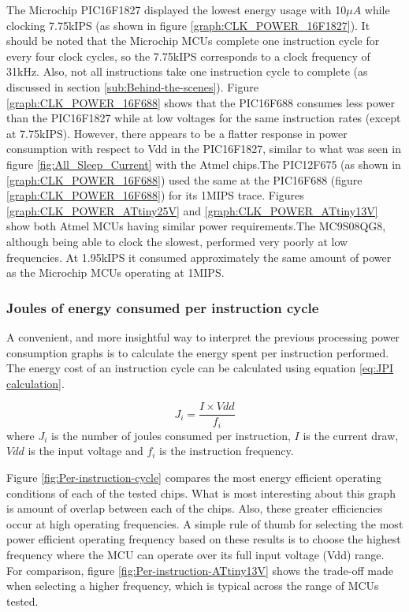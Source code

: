 The Microchip PIC16F1827 displayed the lowest energy usage with 10$\mu A$
while clocking 7.75kIPS (as shown in figure \ref{graph:CLK_POWER_16F1827}).
It should be noted that the Microchip MCUs complete one instruction
cycle for every four clock cycles, so the 7.75kIPS corresponds to
a clock frequency of 31kHz. Also, not all instructions take one instruction
cycle to complete (as discussed in section \ref{sub:Behind-the-scenes}).
Figure \ref{graph:CLK_POWER_16F688} shows that the PIC16F688 consumes
less power than the PIC16F1827 while at low voltages for the same
instruction rates (except at 7.75kIPS). However, there appears to
be a flatter response in power consumption with respect to Vdd in
the PIC16F1827, similar to what was seen in figure \ref{fig:All_Sleep_Current}
with the Atmel chips.The PIC12F675 (as shown in \ref{graph:CLK_POWER_16F688})
used the same at the PIC16F688 (figure \ref{graph:CLK_POWER_16F688})
for its 1MIPS trace. Figures \ref{graph:CLK_POWER_ATtiny25V} and
\ref{graph:CLK_POWER_ATtiny13V} show both Atmel MCUs having similar
power requirements.The MC9S08QG8, although being able to clock the
slowest, performed very poorly at low frequencies. At 1.95kIPS it
consumed approximately the same amount of power as the Microchip MCUs
operating at 1MIPS.


\subsubsection*{Joules of energy consumed per instruction cycle\label{sub:Joules-of-energy}}

A convenient, and more insightful way to interpret the previous processing
power consumption graphs is to calculate the energy spent per instruction
performed. The energy cost of an instruction cycle can be calculated
using equation \ref{eq:JPI calculation}.

\begin{equation}
J_{i}=\frac{I\times Vdd}{f_{i}}\label{eq:JPI calculation}
\end{equation}
where $J_{i}$ is the number of joules consumed per instruction, $I$
is the current draw, $Vdd$ is the input voltage and $f_{i}$ is the
instruction frequency.

Figure \ref{fig:Per-instruction-cycle} compares the most energy efficient
operating conditions of each of the tested chips. What is most interesting
about this graph is amount of overlap between each of the chips. Also,
these greater efficiencies occur at high operating frequencies. A
simple rule of thumb for selecting the most power efficient operating
frequency based on these results is to choose the highest frequency
where the MCU can operate over its full input voltage (Vdd) range.
For comparison, figure \ref{fig:Per-instruction-ATtiny13V} shows
the trade-off made when selecting a higher frequency, which is typical
across the range of MCUs tested.

